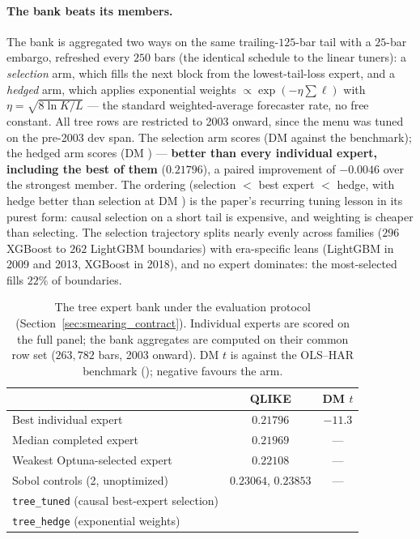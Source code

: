 \paragraph{The bank beats its members.} The bank is aggregated two ways
on the same trailing-$125$-bar tail with a $25$-bar embargo, refreshed
every $250$ bars (the identical schedule to the linear tuners): a
\emph{selection} arm, which fills the next block from the
lowest-tail-loss expert, and a \emph{hedged} arm, which applies
exponential weights $\propto \exp(-\eta \sum \ell)$ with
$\eta = \sqrt{8 \ln K / L}$ --- the standard weighted-average
forecaster rate, no free constant. All tree rows are restricted to
2003 onward, since the menu was tuned on the pre-2003 dev span. The
selection arm scores \unifTreeTunedQLIKE{} (DM \unifTreeTunedDM{}
against the benchmark); the
hedged arm scores \unifTreeHedgeQLIKE{} (DM \unifTreeHedgeDM{}) ---
\textbf{better than every
individual expert, including the best of them} ($0.21796$), a paired
improvement of $-0.0046$ over the strongest member. The ordering
(selection $<$ best expert $<$ hedge, with hedge
\unifIncrTreeHedgeDQ{} better than
selection at DM \unifIncrTreeHedgeDM{}) is the paper's recurring tuning lesson in its
purest form: causal selection on a short tail is expensive, and
weighting is cheaper than selecting. The selection trajectory splits
nearly evenly across families ($296$ XGBoost to $262$ LightGBM
boundaries) with era-specific leans (LightGBM in 2009 and 2013, XGBoost
in 2018), and no expert dominates: the most-selected fills $22\%$ of
boundaries.

\begin{table}[H]
\centering
\caption{The tree expert bank under the evaluation protocol
(Section~\ref{sec:smearing_contract}). Individual experts are scored on
the full panel; the bank aggregates are computed on their common row set
($263{,}782$ bars, 2003 onward). DM $t$ is against the OLS--HAR
benchmark (\unifAzeroQLIKE{}); negative favours the arm.
\label{tab:tree_bank}}
\begin{tabular}{@{}lcc@{}}
\toprule
 & QLIKE & DM $t$ \\
\midrule
Best individual expert & $0.21796$ & $-11.3$ \\
Median completed expert & $0.21969$ & --- \\
Weakest Optuna-selected expert & $0.22108$ & --- \\
Sobol controls (2, unoptimized) & $0.23064$, $0.23853$ & --- \\
\midrule
\texttt{tree\_tuned} (causal best-expert selection) & \unifTreeTunedQLIKE{} & \unifTreeTunedDM{} \\
\texttt{tree\_hedge} (exponential weights) & \unifTreeHedgeQLIKE{} & \unifTreeHedgeDM{} \\
\bottomrule
\end{tabular}
\end{table}

